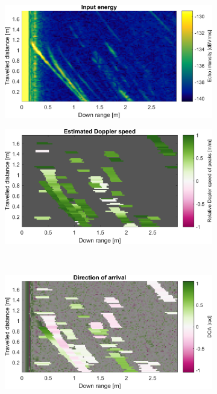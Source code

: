 \begin{figure}[htbp]
    \centering
    \begin{subfigure}[t]{0.475\linewidth}
        \centering
        \includegraphics[width=\linewidth,max height=.475\textheight]{gfx/results/lobby_input.png}
    \end{subfigure}%
    \hfill%
    \begin{subfigure}[t]{0.475\linewidth}
        \centering
        \includegraphics[width=\linewidth,max height=.475\textheight]{gfx/results/lobby_doppler.png}
    \end{subfigure}\bigskip\\
    \begin{subfigure}[t]{0.475\linewidth}
        \centering
        \includegraphics[width=\linewidth,max height=.475\textheight]{gfx/results/lobby_doa.png}

\end{subfigure}
\end{figure}
